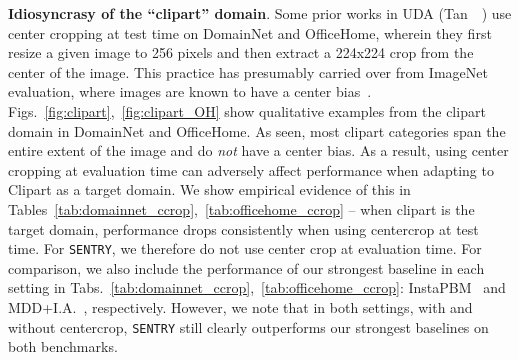 \documentclass[10pt,twocolumn,letterpaper]{article}
\newcommand{\method}{\texttt{SENTRY}\xspace}
\begin{document}
\par \noindent \textbf{Idiosyncrasy of the ``clipart'' domain}. Some prior works in UDA (\eg Tan~\etal~\cite{tan2019generalized}) use center cropping at test time on DomainNet and OfficeHome, wherein they first resize a given image to 256 pixels and then extract a 224x224 crop from the center of the image. This practice has presumably carried over from ImageNet evaluation, where images are known to have a center bias~\cite{torralba2011unbiased}. Figs.~\ref{fig:clipart},~\ref{fig:clipart_OH} show qualitative examples from the clipart domain in DomainNet and OfficeHome. As seen, most clipart categories span the entire extent of the image and do \emph{not} have a center bias. As a result, using center cropping at evaluation time can adversely affect performance when adapting to Clipart as a target domain. We show empirical evidence of this in Tables~\ref{tab:domainnet_ccrop},~\ref{tab:officehome_ccrop} -- when clipart is the target domain, performance drops consistently when using centercrop at test time. For \method, we therefore do not use center crop at evaluation time. For comparison, we also include the performance of our strongest baseline in each setting in Tabs.~\ref{tab:domainnet_ccrop},~\ref{tab:officehome_ccrop}: InstaPBM~\cite{li2020rethinking} and MDD+I.A.~\cite{jiang2020implicit}, respectively. However, we note that in both settings, with and without centercrop, \method still clearly outperforms our strongest baselines on both benchmarks.
\end{document}
